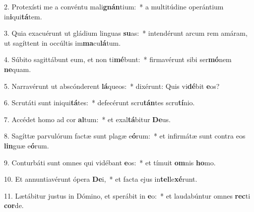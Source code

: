 2. Protexísti me a convéntu mali\textbf{gnán}tium:~*  a multitúdine operántium in\textbf{i}qui\textbf{tá}tem.\

3. Quia exacuérunt ut gládium linguas \textbf{su}as:~*  intendérunt arcum rem amáram, ut sagíttent in occúltis im\textbf{ma}cu\textbf{lá}tum.\

4. Súbito sagittábunt eum, et non ti\textbf{mé}bunt:~*  firmavérunt sibi ser\textbf{mó}nem \textbf{ne}quam.\

5. Narravérunt ut abscónderent \textbf{lá}queos:~*  dixérunt: Quis vi\textbf{dé}bit \textbf{e}os?\

6. Scrutáti sunt iniqui\textbf{tá}tes:~*  defecérunt scru\textbf{tán}tes scru\textbf{tí}nio.\

7. Accédet homo ad cor \textbf{al}tum:~*  et exal\textbf{tá}bitur \textbf{De}us.\

8. Sagíttæ parvulórum factæ sunt plagæ e\textbf{ó}rum:~*  et infirmátæ sunt contra eos \textbf{lin}guæ e\textbf{ó}rum.\

9. Conturbáti sunt omnes qui vidébant \textbf{e}os:~*  et tímuit \textbf{om}nis \textbf{ho}mo.\

10. Et annuntiavérunt ópera \textbf{De}i,~*  et facta ejus in\textbf{tel}le\textbf{xé}runt.\

11. Lætábitur justus in Dómino, et sperábit in \textbf{e}o:~*  et laudabúntur omnes \textbf{rec}ti \textbf{cor}de.\

